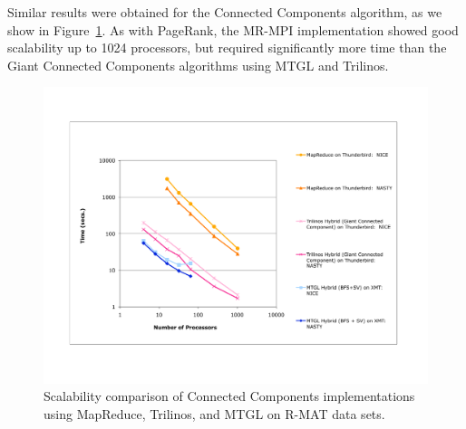 Similar results were obtained for the Connected Components algorithm, as
we show in Figure~\ref{f:ccbig}.  As with PageRank, the MR-MPI implementation
showed good scalability up to 1024 processors, but required significantly
more time than the Giant Connected Components algorithms using MTGL and
Trilinos.

\begin{figure}[h!]
\includegraphics[width=\textwidth]{fig_cc_big.pdf}
\caption{Scalability comparison of Connected Components implementations using MapReduce,
Trilinos, and MTGL on R-MAT data sets.}
\label{f:ccbig}
\end{figure}

